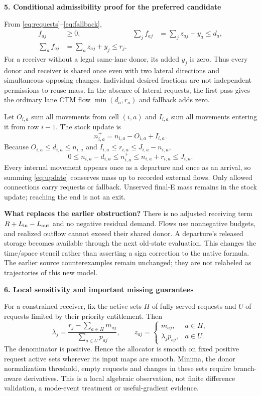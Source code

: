 \documentclass[10pt,a4paper]{article}
\newcommand{\head}[1]{\par\medskip\textbf{#1}\par}
\begin{document}
\newpage
\head{5. Conditional admissibility proof for the preferred candidate}
From \eqref{eq:requests}--\eqref{eq:fallback},
\begin{align}
 f_{aj}&\geq0, &
 \sum_j f_{aj}&=\sum_jz_{aj}+y_a\leq d_a,\nonumber\\
 \sum_a f_{aj}&=\sum_az_{aj}+y_j\leq r_j. \label{eq:budgetproof}
\end{align}
For a receiver without a legal same-lane donor, its added $y_j$ is zero.
Thus every donor and receiver is shared once even with two lateral directions
and simultaneous opposing changes. Individual desired fractions are not
independent permissions to reuse mass. In the absence of lateral requests,
the first pass gives the ordinary lane CTM flow $\min(d_a,r_a)$ and fallback
adds zero.

Let $O_{i,a}$ sum all movements from cell $(i,a)$ and $I_{i,a}$ sum all
movements entering it from row $i-1$. The stock update is
\begin{equation}
 n^{+}_{i,a}=n_{i,a}-O_{i,a}+I_{i,a}. \label{eq:update}
\end{equation}
Because $O_{i,a}\leq d_{i,a}\leq n_{i,a}$ and
$I_{i,a}\leq r_{i,a}\leq J_{i,a}-n_{i,a}$,
\begin{equation}
 0\leq n_{i,a}-d_{i,a}\leq n^{+}_{i,a}
 \leq n_{i,a}+r_{i,a}\leq J_{i,a}. \label{eq:storage}
\end{equation}
Every internal movement appears once as a departure and once as an arrival,
so summing \eqref{eq:update} conserves mass up to recorded external flows.
Only allowed connections carry requests or fallback. Unserved final-E mass
remains in the stock update; reaching the end is not an exit.

\textbf{What replaces the earlier obstruction?} There is no adjusted
receiving term $R+L_{\rm in}-L_{\rm out}$ and no negative residual demand.
Flows use nonnegative budgets, and realized outflow cannot exceed their
shared donor. A departure's released storage becomes available through the
next old-state evaluation. This changes the time/space stencil rather than
asserting a sign correction to the native formula. The earlier source
counterexamples remain unchanged; they are not relabeled as trajectories
of this new model.

\head{6. Local sensitivity and important missing guarantees}
For a constrained receiver, fix the active sets $H$ of fully served requests
and $U$ of requests limited by their priority entitlement. Then
\begin{equation}
 \lambda_j=
 \frac{r_j-\sum_{a\in H}m_{aj}}{\sum_{a\in U}p_{aj}},\qquad
 z_{aj}=\begin{cases}m_{aj},&a\in H,\\
 \lambda_jp_{aj},&a\in U.
 \end{cases} \label{eq:active}
\end{equation}
The denominator is positive. Hence the allocator is smooth on fixed positive
request active sets wherever its input maps are smooth. Minima, the donor
normalization threshold, empty requests and changes in these sets require
branch-aware derivatives. This is a local algebraic observation, not finite
difference validation, a mode-event treatment or useful-gradient evidence.
\end{document}
